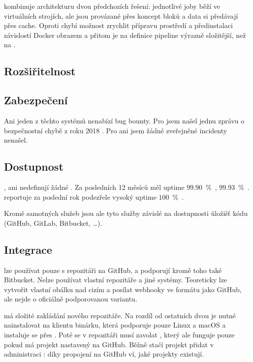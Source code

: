         \semaphore kombinuje architekturu dvou předchozích řešení: jednotlivé joby běží ve virtuálních strojích, ale jsou provázané přes koncept bloků a data si předávají přes cache. Oproti \circleci chybí možnost zrychlit přípravu prostředí a předinstalaci závislostí Docker obrazem a přitom je na \semaphore definice pipeline výrazně složitější, než na \travis.

    \subsection{Rozšiřitelnost}
        \blind[1]

    \subsection{Zabezpečení}
        Ani jeden z těchto  \CI systémů nenabízí bug bounty. Pro \travis jsem našel jednu zprávu o bezpečnostní chybě z roku 2018 \cite{travis-db-drop}. Pro \circleci ani \semaphore jsem žádné zveřejněné incidenty nenašel.

    \subsection{Dostupnost}
        \circleci, \travis ani \semaphore nedefinují žádné . Za posledních 12 měsíců měl \circleci uptime $99.90$~\%~\cite{circle-uptime}, \travis $99.93$~\%~\cite{travis-uptime}. \semaphore reportuje za poslední rok podezřele vysoký uptime $100$~\%~\cite{semaphore-uptime}.

        Kromě samotných \CI služeb jsou ale tyto služby závislé na dostupnosti úložišť kódu (GitHub, GitLab, Bitbucket, …).

    \subsection{Integrace}
        \travis lze používat pouze s repozitáři na GitHub, \circleci a \semaphore podporují kromě toho také Bitbucket. Nelze používat vlastní repozitáře a jiné systémy. Teoreticky lze vytvořit vlastní obálku nad cizím  a posílat webhooky ve formátu jako GitHub, ale nejde o oficiálně podporovanou variantu.

        \semaphore má složité zakládání nového repozitáře. Na rozdíl od ostatních dvou \CI je nutné nainstalovat na klientu binárku, která podporuje pouze Linux a macOS a instaluje se přes . Poté se v repozitáři musí zavolat , který ale funguje pouze pokud má projekt nastavený  na GitHub. Běžně stačí projekt přidat v administraci \CI: díky propojení na GitHub \CI ví, jaké projekty existují.

